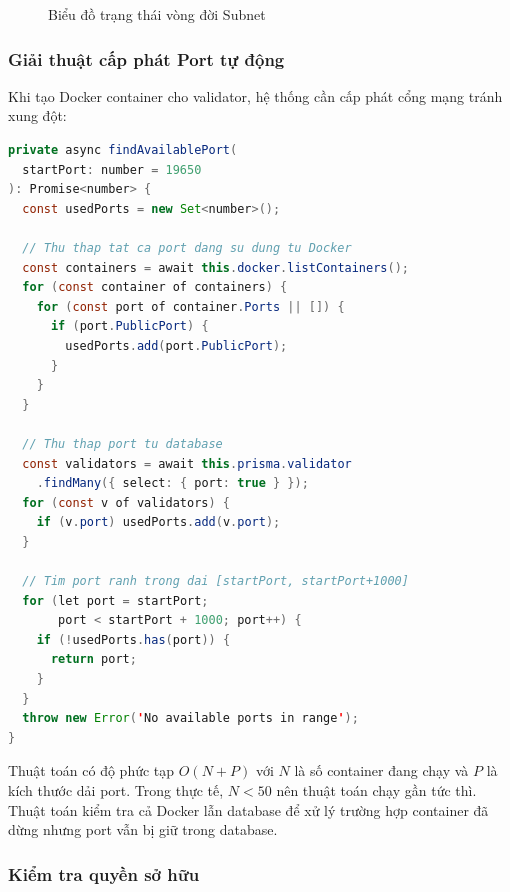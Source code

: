 \begin{figure}[H]
\centering
{}
\caption{Biểu đồ trạng thái vòng đời Subnet}
\label{fig:subnet_lifecycle}
\end{figure}

\subsubsection{Giải thuật cấp phát Port tự động}

Khi tạo Docker container cho validator, hệ thống cần cấp phát cổng mạng tránh xung đột:

\begin{lstlisting}[caption={Thuật toán cấp phát Port tự động}, label={lst:port_allocation}, language=Java]
private async findAvailablePort(
  startPort: number = 19650
): Promise<number> {
  const usedPorts = new Set<number>();

  // Thu thap tat ca port dang su dung tu Docker
  const containers = await this.docker.listContainers();
  for (const container of containers) {
    for (const port of container.Ports || []) {
      if (port.PublicPort) {
        usedPorts.add(port.PublicPort);
      }
    }
  }

  // Thu thap port tu database
  const validators = await this.prisma.validator
    .findMany({ select: { port: true } });
  for (const v of validators) {
    if (v.port) usedPorts.add(v.port);
  }

  // Tim port ranh trong dai [startPort, startPort+1000]
  for (let port = startPort;
       port < startPort + 1000; port++) {
    if (!usedPorts.has(port)) {
      return port;
    }
  }
  throw new Error('No available ports in range');
}
\end{lstlisting}

Thuật toán có độ phức tạp $O(N + P)$ với $N$ là số container đang chạy và $P$ là kích thước dải port. Trong thực tế, $N < 50$ nên thuật toán chạy gần tức thì. Thuật toán kiểm tra cả Docker lẫn database để xử lý trường hợp container đã dừng nhưng port vẫn bị giữ trong database.

\subsubsection{Kiểm tra quyền sở hữu}

